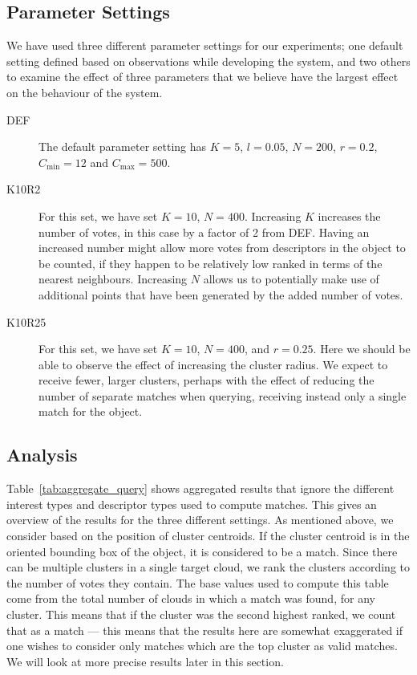 \documentclass[11pt,a4paper]{kth-mag}
\begin{document}
\subsection{Parameter Settings}
We have used three different parameter settings for our experiments; one default
setting defined based on observations while developing the system, and two
others to examine the effect of three parameters that we believe have the
largest effect on the behaviour of the system.
\begin{description}
\item[DEF] The default parameter setting has $K=5$, $l=0.05$, $N=200$, $r=0.2$,
  $C_{\min}=12$ and $C_{\max}=500$.
\item[K10R2] For this set, we have set $K=10$, $N=400$. Increasing $K$ increases
  the number of votes, in this case by a factor of 2 from DEF. Having an
  increased number might allow more votes from descriptors in the object to be
  counted, if they happen to be relatively low ranked in terms of the nearest
  neighbours. Increasing $N$ allows us to potentially make use of additional
  points that have been generated by the added number of votes.
\item[K10R25] For this set, we have set $K=10$, $N=400$, and $r=0.25$. Here we
  should be able to observe the effect of increasing the cluster radius. We
  expect to receive fewer, larger clusters, perhaps with the effect of reducing
  the number of separate matches when querying, receiving instead only a single
  match for the object.
\end{description}

\subsection{Analysis}
Table~\ref{tab:aggregate_query} shows aggregated results that ignore the
different interest types and descriptor types used to compute matches. This
gives an overview of the results for the three different settings. As mentioned
above, we consider based on the position of cluster centroids. If the cluster
centroid is in the oriented bounding box of the object, it is considered to be a
match. Since there can be multiple clusters in a single target cloud, we rank
the clusters according to the number of votes they contain. The base values used
to compute this table come from the total number of clouds in which a match was
found, for any cluster. This means that if the cluster was the second highest
ranked, we count that as a match --- this means that the results here are
somewhat exaggerated if one wishes to consider only matches which are the top
cluster as valid matches. We will look at more precise results later in this
section.
\end{document}
